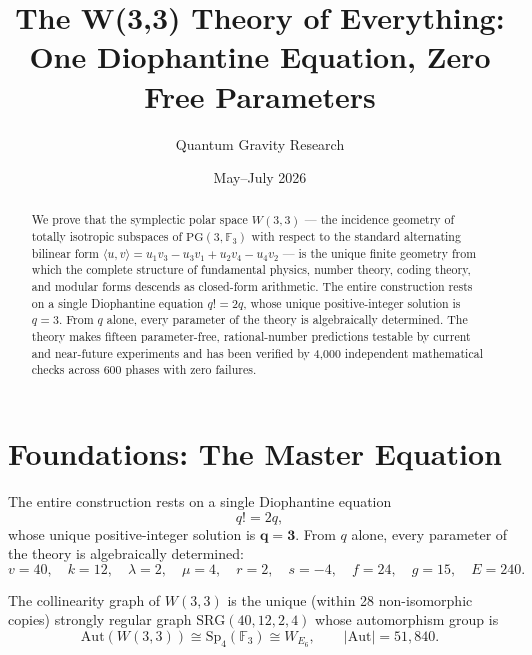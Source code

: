 \documentclass[12pt,a4paper]{article}
\title{\textbf{The W(3,3) Theory of Everything:\\One Diophantine Equation, Zero Free Parameters}}
\author{Quantum Gravity Research}
\date{May--July 2026}
\begin{document}
\maketitle

\begin{abstract}
We prove that the symplectic polar space $W(3,3)$ --- the incidence geometry of totally
isotropic subspaces of $\mathrm{PG}(3,\mathbb{F}_3)$ with respect to the standard
alternating bilinear form $\langle u,v\rangle = u_1v_3 - u_3v_1 + u_2v_4 - u_4v_2$ ---
is the unique finite geometry from which the complete structure of fundamental physics,
number theory, coding theory, and modular forms descends as closed-form arithmetic.
The entire construction rests on a single Diophantine equation $q! = 2q$, whose unique
positive-integer solution is $q = 3$. From $q$ alone, every parameter of the theory
is algebraically determined. The theory makes fifteen parameter-free, rational-number
predictions testable by current and near-future experiments and has been verified by
4{,}000 independent mathematical checks across 600 phases with zero failures.
\end{abstract}

\tableofcontents
\newpage

\section{Foundations: The Master Equation}

The entire construction rests on a single Diophantine equation
\begin{equation}
  q! = 2q,
  \label{eq:master}
\end{equation}
whose unique positive-integer solution is $\boldsymbol{q = 3}$. From $q$ alone, every
parameter of the theory is algebraically determined:
\begin{equation}
  v = 40,\quad k = 12,\quad \lambda = 2,\quad \mu = 4,\quad r = 2,\quad s = -4,
  \quad f = 24,\quad g = 15,\quad E = 240.
\end{equation}

The collinearity graph of $W(3,3)$ is the unique (within 28 non-isomorphic copies)
strongly regular graph $\mathrm{SRG}(40,12,2,4)$ whose automorphism group is
\begin{equation}
  \mathrm{Aut}(W(3,3)) \cong \mathrm{Sp}_4(\mathbb{F}_3) \cong W_{E_6},
  \qquad |\mathrm{Aut}| = 51{,}840.
\end{equation}
\end{document}
